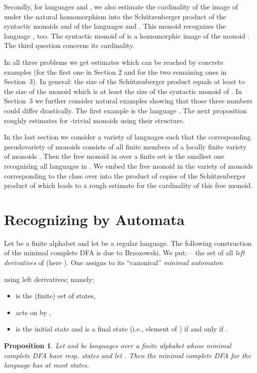 \documentclass[copyright]{eptcs}
\newcounter{theorem}
\newtheorem{proposition}[theorem]{Proposition}
\theoremstyle{definition}
\begin{document}
Secondly, for languages  and , we also estimate 
the cardinality of the image of  under the natural homomorphism 
into the Sch\"utzenberger product of the syntactic monoids  and 
of the languages
 and . This monoid  recognizes the language , too.
The syntactic monoid of 
is a homomorphic image of the monoid .
The third question concerns its cardinality.

In all three problems we get estimates which can be reached by concrete
examples (for the first one in Section 2 and for the two remaining ones 
in Section~3).
In general: the size of the Sch\"utzenberger product equals at least
to the size of the monoid  which is at least the size
of the syntactic monoid of .
In Section~3 we further consider natural examples showing that those
three numbers could differ drastically. The first example
is the language .
The next proposition roughly estimates  for -trivial
monoids using their structure. 


 
In the last section we consider
a variety of languages  such that the corresponding
pseudovariety of monoids consists of all finite members of a locally finite
variety of monoids . Then the free monoid 
in 
over a finite set  is the smallest one recognizing
all languages in .
We  embed the free monoid in the variety of monoids corresponding to
the class
 over  
into the product of
 copies of the Sch\"utzenberger product of 
which leads to a rough
estimate for the cardinality of this free monoid.

\section{Recognizing by Automata}

Let  be a finite alphabet and let  be a regular language.
The following construction of the minimal complete DFA is due to Brzozowski.
We put:
 --
the set of all {\it left derivatives} of 
(here ).
One assigns to  its ``canonical'' {\it minimal automaton}

using left derivatives; namely:
\begin{itemize}
\item  is the (finite) set of states,
\item  acts on  by
,
\item  is the initial state and  is a final state
(i.e., element of  ) if and only if .
\end{itemize}

\begin{proposition}
Let  and  be languages over a finite alphabet  whose minimal
complete DFA have  resp.  states and let .
Then the minimal complete
DFA for the language  has at most  states.
\end{proposition}
\end{document}
